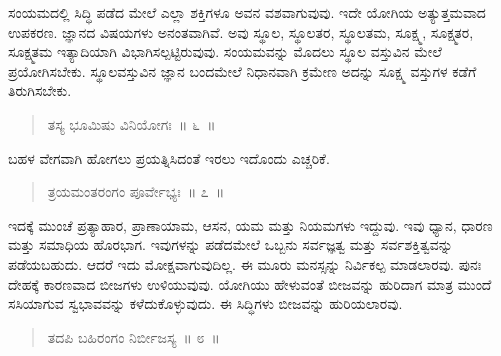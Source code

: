 \vspace{-0.4cm}


\vspace{0.2cm}


 
ಸಂಯಮದಲ್ಲಿ ಸಿದ್ಧಿ ಪಡೆದ ಮೇಲೆ ಎಲ್ಲಾ ಶಕ್ತಿಗಳೂ ಅವನ ವಶವಾಗುವುವು. ಇದೇ ಯೋಗಿಯ ಅತ್ಯುತ್ತಮವಾದ ಉಪಕರಣ. ಜ್ಞಾನದ ವಿಷಯಗಳು ಅನಂತವಾಗಿವೆ. ಅವು ಸ್ಥೂಲ, ಸ್ಥೂಲತರ, ಸ್ಥೂಲತಮ, ಸೂಕ್ಷ್ಮ, ಸೂಕ್ಷ್ಮತರ, ಸೂಕ್ಷ್ಮತಮ ಇತ್ಯಾದಿಯಾಗಿ ವಿಭಾಗಿಸಲ್ಪಟ್ಟಿರುವುವು. ಸಂಯಮವನ್ನು ಮೊದಲು ಸ್ಥೂಲ ವಸ್ತುವಿನ ಮೇಲೆ ಪ್ರಯೋಗಿಸಬೇಕು. ಸ್ಥೂಲವಸ್ತುವಿನ ಜ್ಞಾನ ಬಂದಮೇಲೆ ನಿಧಾನವಾಗಿ ಕ್ರಮೇಣ ಅದನ್ನು ಸೂಕ್ಷ್ಮ ವಸ್ತುಗಳ ಕಡೆಗೆ ತಿರುಗಿಸಬೇಕು. 

\vspace{-0.2cm}

\begin{verse}
ತಸ್ಯ ಭೂಮಿಷು ವಿನಿಯೋಗಃ~॥ ೬~॥
\end{verse}

\vspace{-0.4cm}


\vspace{0.1cm}

ಬಹಳ ವೇಗವಾಗಿ ಹೋಗಲು ಪ್ರಯತ್ನಿಸಿದಂತೆ ಇರಲು ಇದೊಂದು ಎಚ್ಚರಿಕೆ. 

\vspace{-0.2cm}

\begin{verse}
ತ್ರಯಮಂತರಂಗಂ ಪೂರ್ವೇಭ್ಯಃ~॥ ೭~॥
\end{verse}

\vspace{-0.4cm}


\vspace{0.1cm}

ಇದಕ್ಕೆ ಮುಂಚೆ ಪ್ರತ್ಯಾಹಾರ, ಪ್ರಾಣಾಯಾಮ, ಆಸನ, ಯಮ ಮತ್ತು ನಿಯಮಗಳು ಇದ್ದುವು. ಇವು ಧ್ಯಾನ, ಧಾರಣ ಮತ್ತು ಸಮಾಧಿಯ ಹೊರಭಾಗ. ಇವುಗಳನ್ನು ಪಡೆದಮೇಲೆ ಒಬ್ಬನು ಸರ್ವಜ್ಞತ್ವ ಮತ್ತು ಸರ್ವಶಕ್ತಿತ್ವವನ್ನು ಪಡೆಯಬಹುದು. ಆದರೆ ಇದು ಮೋಕ್ಷವಾಗುವುದಿಲ್ಲ. ಈ ಮೂರು ಮನಸ್ಸನ್ನು ನಿರ್ವಿಕಲ್ಪ ಮಾಡಲಾರವು. ಪುನಃ ದೇಹಕ್ಕೆ ಕಾರಣವಾದ ಬೀಜಗಳು ಉಳಿಯುವುವು. ಯೋಗಿಯು ಹೇಳುವಂತೆ ಬೀಜವನ್ನು ಹುರಿದಾಗ ಮಾತ್ರ ಮುಂದೆ ಸಸಿಯಾಗುವ ಸ್ವಭಾವವನ್ನು ಕಳೆದುಕೊಳ್ಳುವುದು. ಈ ಸಿದ್ಧಿಗಳು ಬೀಜವನ್ನು ಹುರಿಯಲಾರವು. 

\vspace{-0.3cm}

\begin{verse}
ತದಪಿ ಬಹಿರಂಗಂ ನಿರ್ಬೀಜಸ್ಯ~॥ ೮~॥
\end{verse}

